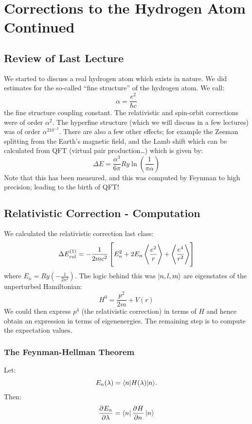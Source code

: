 \section{Corrections to the Hydrogen Atom Continued}
\subsection{Review of Last Lecture}
We started to discuss a real hydrogen atom which exists in nature. We did estimates for the so-called ``fine structure'' of the hydrogen atom. We call:
\begin{equation}
    \alpha = \frac{e^2}{\hbar c}
\end{equation}
the fine structure coupling constant. The relativistic and spin-orbit corrections were of order $\alpha^2$. The hyperfine structure (which we will discuss in a few lectures) was of order $\alpha^210^{-3}$. There are also a few other effects; for example the Zeeman splitting from the Earth's magnetic field, and the Lamb shift which can be calculated from QFT (virtual pair production\ldots) which is given by:
\begin{equation}
    \Delta E = \frac{\alpha^3}{6\pi}\si{Ry}\ln\left(\frac{1}{\pi\alpha}\right)
\end{equation}
Note that this has been measured, and this was computed by Feynman to high precision; leading to the birth of QFT! 

\subsection{Relativistic Correction - Computation}
We calculated the relativistic correction last class:
\begin{equation}
    \Delta E_{rel}^{(1)} = -\frac{1}{2mc^2}\left[E_n^2 + 2E_n\left< \frac{e^2}{r} \right> + \left< \frac{e^4}{r^2} \right>\right]
\end{equation}
where $E_n = \si{Ry}\left(-\frac{1}{2n^2}\right)$. The logic behind this was $\lvert n, l, m \rangle$ are eigenstates of the unperturbed Hamiltonian:
\begin{equation}
    H^{0} = \frac{p^2}{2m} + V(r)
\end{equation}
We could then express $p^4$ (the relativistic correction) in terms of $H$ and hence obtain an expression in terms of eigenenergies. The remaining step is to compute the expectation values.

\subsubsection{The Feynman-Hellman Theorem}
Let:
\begin{equation}
    E_n(\lambda) = \langle n \rvert H(\lambda)\lvert n \rangle.
\end{equation}
Then:
\begin{equation}
    \dpd{E_n}{\lambda} = \bra{n}\dpd{H}{n}\ket{n}
\end{equation}

